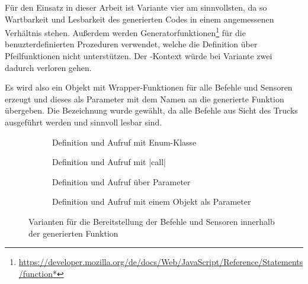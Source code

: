 Für den Einsatz in dieser Arbeit ist Variante vier am sinnvollsten, da so Wartbarkeit und Lesbarkeit des generierten Codes in einem angemessenen Verhältnis stehen. Außerdem werden Generatorfunktionen\footnote{\url{https://developer.mozilla.org/de/docs/Web/JavaScript/Reference/Statements/function*}} für die benuzterdefinierten Prozeduren verwendet, welche die Definition über Pfeilfunktionen nicht unterstützen. Der -Kontext würde bei Variante zwei dadurch verloren gehen.

Es wird also ein Objekt mit Wrapper-Funktionen für alle Befehle und Sensoren erzeugt und dieses als Parameter mit dem Namen  an die generierte Funktion übergeben. Die Bezeichnung  wurde gewählt, da alle Befehle aus Sicht des Trucks ausgeführt werden und  sinnvoll lesbar sind.

\begin{figure}
  \begin{subfigure}[b]{\textwidth}
    
    \caption{Definition und Aufruf mit Enum-Klasse}
    \label{fig:implementation:environment:func}
    \vspace{0.5cm}
  \end{subfigure}
  \begin{subfigure}[b]{\textwidth}
    
    \caption{Definition und Aufruf mit \inlinec|call|}
    \label{fig:implementation:environment:this}
    \vspace{0.5cm}
  \end{subfigure}
  \begin{subfigure}[b]{\textwidth}
    
    \caption{Definition und Aufruf über Parameter}
    \label{fig:implementation:environment:param}
    \vspace{0.5cm}
  \end{subfigure}
  \begin{subfigure}[b]{\textwidth}
    
    \caption{Definition und Aufruf mit einem Objekt als Parameter}
    \label{fig:implementation:environment:obj}
  \end{subfigure}
  \caption{Varianten für die Bereitstellung der Befehle und Sensoren innerhalb der generierten Funktion}
  \label{fig:implementation:environment}
\end{figure}

